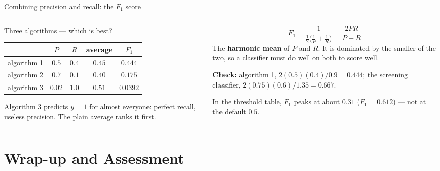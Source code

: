 \documentclass[aspectratio=169,10pt]{beamer}
\begin{document}
\begin{frame}{Combining precision and recall: the $F_1$ score}
  \begin{columns}[T,onlytextwidth]
    \begin{column}{0.5\textwidth}
      \footnotesize
      \begin{block}{Three algorithms --- which is best?}
        \renewcommand{\arraystretch}{1.15}
        \begin{tabular}{@{}lcccc@{}}
          \toprule
          & $P$ & $R$ & average & $F_1$\\
          \midrule
          algorithm 1 & $0.5$  & $0.4$ & $0.45$ & $\mathbf{0.444}$\\
          algorithm 2 & $0.7$  & $0.1$ & $0.40$ & $0.175$\\
          algorithm 3 & $0.02$ & $1.0$ & $\mathbf{0.51}$ & $0.0392$\\
          \bottomrule
        \end{tabular}
      \end{block}
      Algorithm 3 predicts $y=1$ for almost everyone: perfect recall, useless precision.
      The plain average ranks it first.
    \end{column}
    \begin{column}{0.46\textwidth}
      \begin{defnbox}[$F_1$ score]
        \small
        \[ F_1=\frac{1}{\tfrac12\bigl(\tfrac1P+\tfrac1R\bigr)}=\frac{2PR}{P+R} \]
        The \textbf{harmonic mean} of $P$ and $R$. It is dominated by the smaller of the
        two, so a classifier must do well on both to score well.
      \end{defnbox}
      \footnotesize
      \textbf{Check:} algorithm 1, $2(0.5)(0.4)/0.9=0.444$; the screening classifier,
      $2(0.75)(0.6)/1.35=0.667$.\par
      \vspace{1mm}
      In the threshold table, $F_1$ peaks at about $0.31$ ($F_1=0.612$) --- not at the
      default $0.5$.
    \end{column}
  \end{columns}
\end{frame}

\section{Wrap-up and Assessment}
\end{document}
